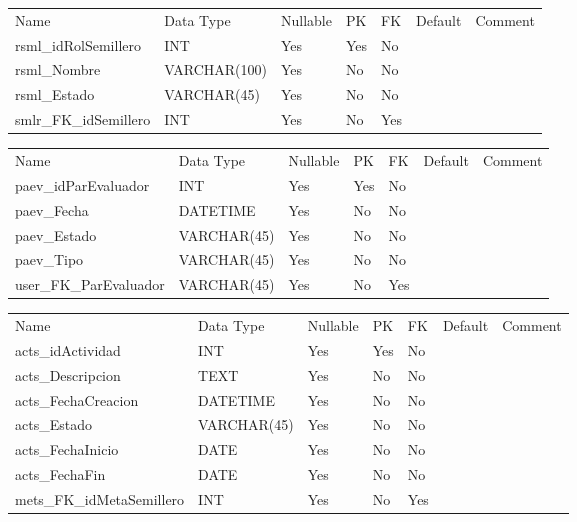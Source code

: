 			\begin{center}
				\begin{tabular}{ |l|l|l|l|l|l|l| }
					\hline
					Name & Data Type & Nullable & PK & FK & Default & Comment \\
					rsml_idRolSemillero & INT & Yes & Yes & No &  & \\ \hline 
rsml_Nombre & VARCHAR(100) & Yes & No & No &  & \\ \hline 
rsml_Estado & VARCHAR(45) & Yes & No & No &  & \\ \hline 
smlr_FK_idSemillero & INT & Yes & No & Yes &  & \\ \hline 

				\end{tabular}
			\end{center}
		

			\begin{center}
				\begin{tabular}{ |l|l|l|l|l|l|l| }
					\hline
					Name & Data Type & Nullable & PK & FK & Default & Comment \\
					paev_idParEvaluador & INT & Yes & Yes & No &  & \\ \hline 
paev_Fecha & DATETIME & Yes & No & No &  & \\ \hline 
paev_Estado & VARCHAR(45) & Yes & No & No &  & \\ \hline 
paev_Tipo & VARCHAR(45) & Yes & No & No &  & \\ \hline 
user_FK_ParEvaluador & VARCHAR(45) & Yes & No & Yes &  & \\ \hline 

				\end{tabular}
			\end{center}
		

			\begin{center}
				\begin{tabular}{ |l|l|l|l|l|l|l| }
					\hline
					Name & Data Type & Nullable & PK & FK & Default & Comment \\
					acts_idActividad & INT & Yes & Yes & No &  & \\ \hline 
acts_Descripcion & TEXT & Yes & No & No &  & \\ \hline 
acts_FechaCreacion & DATETIME & Yes & No & No &  & \\ \hline 
acts_Estado & VARCHAR(45) & Yes & No & No &  & \\ \hline 
acts_FechaInicio & DATE & Yes & No & No &  & \\ \hline 
acts_FechaFin & DATE & Yes & No & No &  & \\ \hline 
mets_FK_idMetaSemillero & INT & Yes & No & Yes &  & \\ \hline 

				\end{tabular}
			\end{center}
		

